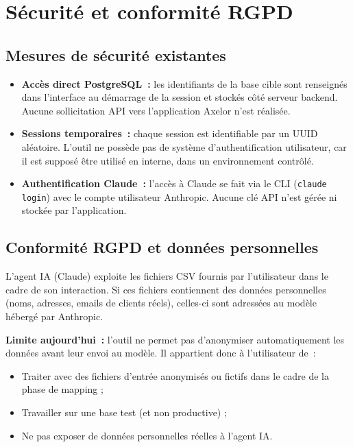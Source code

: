 \clearpage
\section{Sécurité et conformité RGPD}
\label{sec:securite}

\subsection{Mesures de sécurité existantes}

\begin{itemize}
    \item \textbf{Accès direct PostgreSQL~:} les identifiants de la base cible sont renseignés dans l'interface au démarrage de la session et stockés côté serveur backend. Aucune sollicitation API vers l'application Axelor n'est réalisée.
    \item \textbf{Sessions temporaires~:} chaque session est identifiable par un UUID aléatoire. L'outil ne possède pas de système d'authentification utilisateur, car il est supposé être utilisé en interne, dans un environnement contrôlé.
    \item \textbf{Authentification Claude~:} l'accès à Claude se fait via le CLI (\texttt{claude login}) avec le compte utilisateur Anthropic. Aucune clé API n'est gérée ni stockée par l'application.
\end{itemize}

\subsection{Conformité RGPD et données personnelles}

L'agent IA (Claude) exploite les fichiers CSV fournis par l'utilisateur dans le cadre de son interaction. Si ces fichiers contiennent des données personnelles (noms, adresses, emails de clients réels), celles-ci sont adressées au modèle hébergé par Anthropic.

\textbf{Limite aujourd'hui~:} l'outil ne permet pas d'anonymiser automatiquement les données avant leur envoi au modèle. Il appartient donc à l'utilisateur de~:
\begin{itemize}
    \item Traiter avec des fichiers d'entrée anonymisés ou fictifs dans le cadre de la phase de mapping ;
    \item Travailler sur une base test (et non productive) ;
    \item Ne pas exposer de données personnelles réelles à l'agent IA.
\end{itemize}

